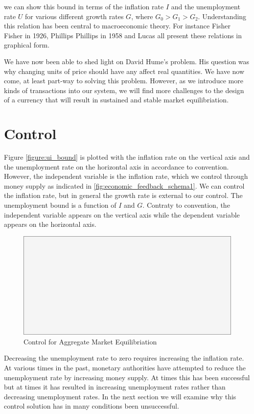 we can show this bound in terms of the inflation
rate $I$ and the unemployment rate $U$ for various different growth rates $G$, where $G_0 > G_1 >
G_2$. Understanding this relation has been central to macroeconomic theory. For instance Fisher
Fisher \cite{fisher1926} in 1926, Phillips Phillips \cite{phillips1958} in 1958 and Lucas
\cite{lucas1996} all present these relations in graphical form.

We have now been able to shed light on David Hume's problem. His question was why changing units of
price should have any affect real quantities. We have now come, at least part-way to solving this
problem. However, as we introduce more kinds of transactions into our system, we will find more
challenges to the design of a currency that will result in sustained and stable market
equilibriation.  

\section{Control}

Figure \ref{figure:ui_bound} is plotted with the inflation rate on the vertical axis and the
unemployment rate on the horizontal axis in accordance to convention. However, the independent
variable is the inflation rate, which we control through money supply as indicated in
\ref{fig:economic_feedback_schema1}. We can control the inflation rate, but in general the growth
rate is external to our control. The unemployment bound is a function of $I$ and $G$. Contraty to
convention, the independent variable appears on the vertical axis while the dependent variable
appears on the horizontal axis. 

\begin{figure}[H]
\centering
\includegraphics[scale=0.48]{blank}
\caption{Control for Aggregate Market Equilibriation}
\label{fig:control_for_equil}
\end{figure}

Decreasing the unemployment rate to zero requires increasing the inflation rate. At various times in
the past, monetary authorities have attempted to reduce the unemployment rate by increasing money
supply. At times this has been successful but at times it has resulted in increasing unemployment
rates rather than decreasing unemployment rates. In the next section we will examine why this
control solution has in many conditions been unsuccessful.
